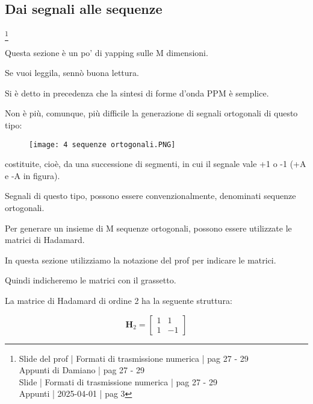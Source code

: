 \newpage 


\subsection{Dai segnali alle sequenze}
\footnote{Slide del prof | Formati di trasmissione numerica | pag 27 - 29\\  
Appunti di Damiano | pag 27 - 29\\
Slide | Formati di trasmissione numerica | pag  27 - 29\\
Appunti | 2025-04-01 | pag 3
}

\begin{tcolorbox}
    Questa sezione è un po' di yapping sulle M dimensioni. \newline 

    Se vuoi leggila, sennò buona lettura.
\end{tcolorbox}

Si è detto in precedenza che la sintesi di forme d'onda PPM è semplice. \newline 

Non è più, comunque, più difficile la generazione di segnali ortogonali di questo tipo: 

\begin{figure}[h]
    \centering
    \texttt{[image: 4 sequenze ortogonali.PNG]}
\end{figure}

costituite, cioè, da una successione di segmenti, 
in cui il segnale vale +1 o -1 (+A e -A in figura). \newline 

Segnali di questo tipo, possono essere convenzionalmente, denominati sequenze ortogonali. \newline 

Per generare un insieme di M sequenze ortogonali, possono essere utilizzate le matrici di Hadamard. \newline 

\begin{tcolorbox}
    In questa sezione utilizziamo la notazione del prof per indicare le matrici. \newline 

    Quindi indicheremo le matrici con il grassetto.
\end{tcolorbox}

La matrice di Hadamard di ordine 2 ha la seguente struttura: 

{
    \Large 
    \begin{equation}
        \textbf{H}_2 
        = 
        \begin{bmatrix}
            1 & 1 \\
            1 & -1
        \end{bmatrix}
    \end{equation}
}

